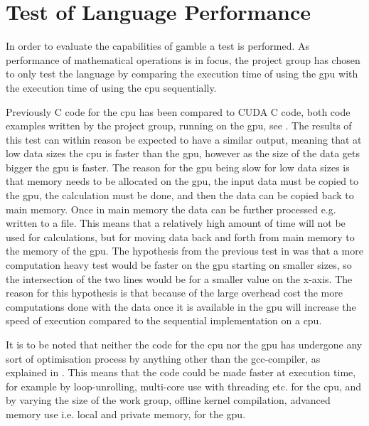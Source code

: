 \chapter{Test of Language Performance} %
\label{cha:test_of_language}
In order to evaluate the capabilities of \gls{gamble} a test is performed. 
As performance of mathematical operations is in focus, the project group has chosen to only test the language by comparing the execution time of using the \acrshort{gpu} with the execution time of using the \acrshort{cpu} sequentially. 

Previously C code for the \acrshort{cpu} has been compared to CUDA C code, both code examples written by the project group, running on the \acrshort{gpu}, see .
The results of this test can within reason be expected to have a similar output, meaning that at low data sizes the \acrshort{cpu} is faster than the \acrshort{gpu}, however as the size of the data gets bigger the \acrshort{gpu} is faster.
The reason for the \acrshort{gpu} being slow for low data sizes is that memory needs to be allocated on the \acrshort{gpu}, the input data must be copied to the \acrshort{gpu}, the calculation must be done, and then the data can be copied back to main memory. 
Once in main memory the data can be further processed e.g. written to a file. 
This means that a relatively high amount of time will not be used for calculations, but for moving data back and forth from main memory to the memory of the \acrshort{gpu}.
The hypothesis from the previous test in  was that a more computation heavy test would be faster on the \acrshort{gpu} starting on smaller sizes, so the intersection of the two lines would be for a smaller value on the x-axis. 
The reason for this hypothesis is that because of the large overhead cost the more computations done with the data once it is available in the \acrshort{gpu} will increase the speed of execution compared to the sequential implementation on a \acrshort{cpu}.

It is to be noted that neither the code for the \acrshort{cpu} nor the \acrshort{gpu} has undergone any sort of optimisation process by anything other than the gcc-compiler, as explained in . 
This means that the code could be made faster at execution time, for example by loop-unrolling, multi-core use with threading etc. for the \acrshort{cpu}, and by varying the size of the work group, offline kernel compilation, advanced memory use i.e. local and private memory, for the \acrshort{gpu}.  

